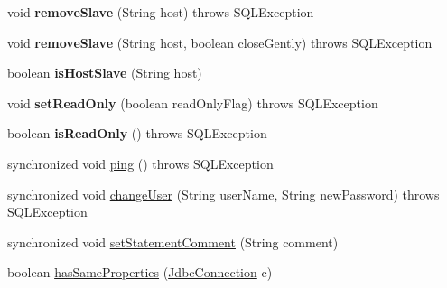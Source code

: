 \begin{DoxyCompactItemize}
void {\bfseries remove\+Slave} (String host)  throws S\+Q\+L\+Exception 
\item 
\mbox{\label{classcom_1_1mysql_1_1cj_1_1jdbc_1_1ha_1_1_replication_my_s_q_l_connection_a8552a17ffb5ad710e46bae3f5aad53f7}} 
void {\bfseries remove\+Slave} (String host, boolean close\+Gently)  throws S\+Q\+L\+Exception 
\item 
\mbox{\label{classcom_1_1mysql_1_1cj_1_1jdbc_1_1ha_1_1_replication_my_s_q_l_connection_a55c6af349813e6a4b4527207647beadb}} 
boolean {\bfseries is\+Host\+Slave} (String host)
\item 
\mbox{\label{classcom_1_1mysql_1_1cj_1_1jdbc_1_1ha_1_1_replication_my_s_q_l_connection_af5970929ca56566eb6191de86461468e}} 
void {\bfseries set\+Read\+Only} (boolean read\+Only\+Flag)  throws S\+Q\+L\+Exception 
\item 
\mbox{\label{classcom_1_1mysql_1_1cj_1_1jdbc_1_1ha_1_1_replication_my_s_q_l_connection_acd2b666738b70f41d415e2e3a4e0ec6f}} 
boolean {\bfseries is\+Read\+Only} ()  throws S\+Q\+L\+Exception 
\item 
synchronized void \mbox{\hyperlink{classcom_1_1mysql_1_1cj_1_1jdbc_1_1ha_1_1_replication_my_s_q_l_connection_a87a413280dac1e1f0be1bd8c93420082}{ping}} ()  throws S\+Q\+L\+Exception 
\item 
synchronized void \mbox{\hyperlink{classcom_1_1mysql_1_1cj_1_1jdbc_1_1ha_1_1_replication_my_s_q_l_connection_a42cf4364f5721814b388fa7bef9fb009}{change\+User}} (String user\+Name, String new\+Password)  throws S\+Q\+L\+Exception 
\item 
synchronized void \mbox{\hyperlink{classcom_1_1mysql_1_1cj_1_1jdbc_1_1ha_1_1_replication_my_s_q_l_connection_a7afc9e0c6196c0acd9f60ca99c5e7b8a}{set\+Statement\+Comment}} (String comment)
\item 
boolean \mbox{\hyperlink{classcom_1_1mysql_1_1cj_1_1jdbc_1_1ha_1_1_replication_my_s_q_l_connection_abceb3d3792b7bb70f6ba4f38c5c4a048}{has\+Same\+Properties}} (\mbox{\hyperlink{interfacecom_1_1mysql_1_1cj_1_1jdbc_1_1_jdbc_connection}{Jdbc\+Connection}} c)
\item 

\end{DoxyCompactItemize}
